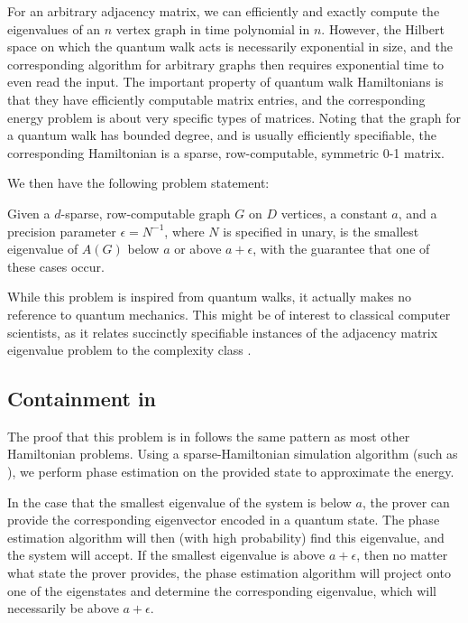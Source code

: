 \documentclass[../thesis-main/thesis-main]{subfiles}
\begin{document}
For an arbitrary adjacency matrix, we can efficiently and exactly compute the eigenvalues of an $n$ vertex graph in time polynomial in $n$. However, the Hilbert space on which the quantum walk acts is necessarily exponential in size, and the corresponding algorithm for arbitrary graphs then requires exponential time to even read the input.  The important property of quantum walk Hamiltonians is that they have efficiently computable matrix entries, and the corresponding energy problem is about very specific types of matrices.  Noting that the graph for a quantum walk has bounded degree, and is usually efficiently specifiable, the corresponding Hamiltonian is a sparse, row-computable, symmetric 0-1 matrix.  

We then have the following problem statement:

\begin{problem} Given a $d$-sparse, row-computable graph $G$ on $D$ vertices, a constant $a$, and a precision parameter $\epsilon = N^{-1}$, where $N$ is specified in unary, is the smallest eigenvalue of $A(G)$ below $a$ or above $a+\epsilon$, with the guarantee that one of these cases occur.
\end{problem}

While this problem is inspired from quantum walks, it actually makes no reference to quantum mechanics.  This might be of interest to classical computer scientists, as it relates succinctly specifiable instances of the adjacency matrix eigenvalue problem to the complexity class \QMA.

\subsection{Containment in \QMA}

The proof that this problem is in \QMA{} follows the same pattern as most other Hamiltonian problems.  Using a sparse-Hamiltonian simulation algorithm (such as \cite{BACS07,BCK15}), we perform phase estimation \cite{CEMM98} on the provided state to approximate the energy.


In the case that the smallest eigenvalue of the system is below $a$, the prover can provide the corresponding eigenvector encoded in a quantum state.  The phase estimation algorithm will then (with high probability) find this eigenvalue, and the system will accept.  If the smallest eigenvalue is above $a+\epsilon$, then no matter what state the prover provides, the phase estimation algorithm will project onto one of the eigenstates and determine the corresponding eigenvalue, which will necessarily be above $a+\epsilon$.
\end{document}
